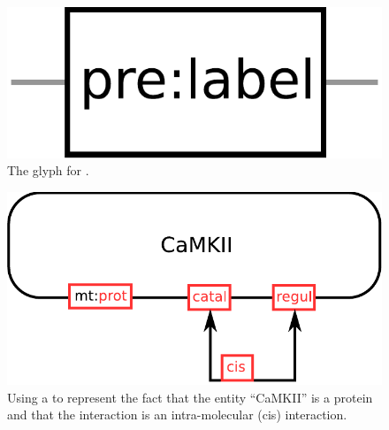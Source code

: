 \begin{figure}[H]
  \centering
  \includegraphics[scale = 0.3]{images/unitInformation}
  \caption{The \ER glyph for .}
  \label{fig:unitInformation}
\end{figure}


\begin{figure}[H]
  \centering
  \includegraphics[scale = 0.5]{examples/ex-unitInformation}
  \caption{Using a  to represent the fact that the entity ``CaMKII'' is a protein and that the interaction is an intra-molecular (cis) interaction.}
  \label{fig:ex-unitInformation}
\end{figure}

\normalcolor
